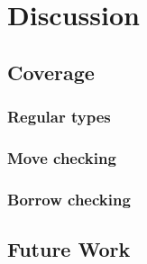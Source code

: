\section{Discussion}\label{s:discussion}


\subsection{Coverage}

\subsubsection{Regular types}


\subsubsection{Move checking}


\subsubsection{Borrow checking}


\subsection{Future Work}\label{s:future_work}
